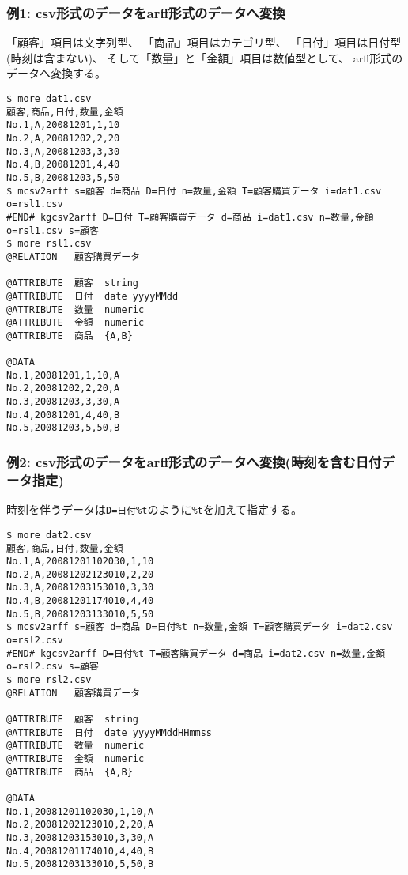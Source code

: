 \subsubsection*{例1: csv形式のデータをarff形式のデータへ変換}

「顧客」項目は文字列型、
「商品」項目はカテゴリ型、
「日付」項目は日付型(時刻は含まない)、
そして「数量」と「金額」項目は数値型として、
arff形式のデータへ変換する。


\begin{Verbatim}[baselinestretch=0.7,frame=single]
$ more dat1.csv
顧客,商品,日付,数量,金額
No.1,A,20081201,1,10
No.2,A,20081202,2,20
No.3,A,20081203,3,30
No.4,B,20081201,4,40
No.5,B,20081203,5,50
$ mcsv2arff s=顧客 d=商品 D=日付 n=数量,金額 T=顧客購買データ i=dat1.csv  o=rsl1.csv
#END# kgcsv2arff D=日付 T=顧客購買データ d=商品 i=dat1.csv n=数量,金額 o=rsl1.csv s=顧客
$ more rsl1.csv
@RELATION	顧客購買データ

@ATTRIBUTE	顧客	string
@ATTRIBUTE	日付	date yyyyMMdd
@ATTRIBUTE	数量	numeric
@ATTRIBUTE	金額	numeric
@ATTRIBUTE	商品	{A,B}

@DATA
No.1,20081201,1,10,A
No.2,20081202,2,20,A
No.3,20081203,3,30,A
No.4,20081201,4,40,B
No.5,20081203,5,50,B
\end{Verbatim}
\subsubsection*{例2: csv形式のデータをarff形式のデータへ変換(時刻を含む日付データ指定)}

時刻を伴うデータは\verb|D=日付%t|のように\verb|%t|を加えて指定する。


\begin{Verbatim}[baselinestretch=0.7,frame=single]
$ more dat2.csv
顧客,商品,日付,数量,金額
No.1,A,20081201102030,1,10
No.2,A,20081202123010,2,20
No.3,A,20081203153010,3,30
No.4,B,20081201174010,4,40
No.5,B,20081203133010,5,50
$ mcsv2arff s=顧客 d=商品 D=日付%t n=数量,金額 T=顧客購買データ i=dat2.csv  o=rsl2.csv
#END# kgcsv2arff D=日付%t T=顧客購買データ d=商品 i=dat2.csv n=数量,金額 o=rsl2.csv s=顧客
$ more rsl2.csv
@RELATION	顧客購買データ

@ATTRIBUTE	顧客	string
@ATTRIBUTE	日付	date yyyyMMddHHmmss
@ATTRIBUTE	数量	numeric
@ATTRIBUTE	金額	numeric
@ATTRIBUTE	商品	{A,B}

@DATA
No.1,20081201102030,1,10,A
No.2,20081202123010,2,20,A
No.3,20081203153010,3,30,A
No.4,20081201174010,4,40,B
No.5,20081203133010,5,50,B
\end{Verbatim}
